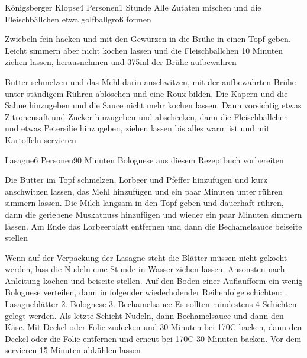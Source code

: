 \begin{recipe}{Königsberger Klopse}{4 Personen}{1 Stunde}
Alle Zutaten mischen und die Fleischbällchen etwa golfballgroß formen

Zwiebeln fein hacken und mit den Gewürzen in die Brühe  in einen Topf geben.
Leicht simmern aber nicht kochen lassen und die Fleischbällchen 10 Minuten ziehen lassen, herausnehmen und 375ml der Brühe aufbewahren

Butter schmelzen und das Mehl darin anschwitzen, mit der aufbewahrten Brühe unter ständigem Rühren ablöschen und eine Roux bilden. Die Kapern und die Sahne hinzugeben und die Sauce nicht mehr kochen lassen. Dann vorsichtig etwas Zitronensaft und Zucker hinzugeben und abschecken, dann die Fleischbällchen und etwas Petersilie hinzugeben, ziehen lassen bis alles warm ist und mit Kartoffeln servieren
\end{recipe}


\begin{recipe}{Lasagne}{6 Personen}{90 Minuten}
Bolognese aus diesem Rezeptbuch vorbereiten

Die Butter im Topf schmelzen, Lorbeer und Pfeffer hinzufügen und kurz anschwitzen lassen, das Mehl hinzufügen und ein paar Minuten unter rühren simmern lassen. Die Milch langsam in den Topf geben und dauerhaft rühren, dann die geriebene Muskatnuss hinzufügen und wieder ein paar Minuten simmern lassen. Am Ende das Lorbeerblatt entfernen und dann die Bechamelsauce beiseite stellen

Wenn auf der Verpackung der Lasagne steht die Blätter müssen nicht gekocht werden, lass die Nudeln eine Stunde in Wasser ziehen lassen. Ansonsten nach Anleitung kochen und beiseite stellen. Auf den Boden einer Auflaufform ein wenig Bolognese verteilen, dann in folgender wiederholender Reihenfolge schichten: . Lasagneblätter
2. Bolognese
3. Bechamelsauce
\newline
Es sollten mindestens 4 Schichten gelegt werden. Als letzte Schicht Nudeln, dann Bechamelsauce und dann den Käse.
Mit Deckel oder Folie zudecken und 30 Minuten bei 170\0C backen, dann den Deckel oder die Folie entfernen und erneut bei 170\0C 30 Minuten backen. Vor dem servieren 15 Minuten abkühlen lassen
\end{recipe}

